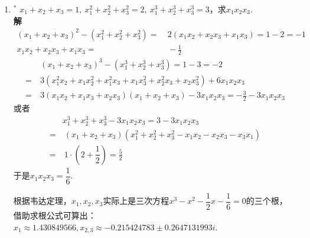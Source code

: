 \begin{enumerate}[label={【\textbf{例\thechapter.\arabic*}】},
 leftmargin=\inteval{\myenumleftmargin}pt,
 itemsep=\inteval{\myenumitempsep}pt,
 itemindent=\inteval{\myenumitemindent}pt]
\item $ ^* $ $ x_1+x_2+x_3=1,\ x_1^2+x_2^2+x_3^2=2,\ 
x_1^3+x_2^3+x_3^3=3 $，求$ x_1x_2x_3 $. \\
\textbf{解}\ 
\begin{align*}
    (x_1+x_2+x_3)^2-(x_1^2+x_2^2+x_3^2)=&\ 2(x_1x_2+x_2x_3+x_1x_3)=1-2=-1\\
    x_1x_2+x_2x_3+x_1x_3=&\ -\frac{1}{2} 
\end{align*}
\begin{align*}
     &\ (x_1+x_2+x_3)^3-(x_1^3+x_2^3+x_3^3)=1-3=-2 \\
    =&\ 3(x_1^2x_2+x_1x_2^2+x_1^2x_3+x_1x_3^2+x_2^2x_3+x_2x_3^2)+6x_1x_2x_3\\
    =&\ 3(x_1x_2+x_1x_3+x_2x_3)(x_1+x_2+x_3)-3x_1x_2x_3
    =-\frac{3}{2}-3x_1x_2x_3
\end{align*}
或者
\begin{align*}
    & x_1^3+x_2^3+x_3^3-3x_1x_2x_3=3-3x_1x_2x_3  \\
    =&\  (x_1+x_2+x_3)(x_1^2+x_2^2+x_3^2-x_1x_2-x_2x_3-x_3x_1)\\
    =&\  1\cdot\left(2+\dfrac{1}{2}\right)=\frac{5}{2}
\end{align*}
于是$ x_1x_2x_3=\dfrac{1}{6} $. 

根据韦达定理，$ x_1,x_2,x_3 $实际上是三次方程$ x^3-x^2-\dfrac{1}{2}x-
\dfrac{1}{6}=0 $的三个根，
借助求根公式可算出：$ x_1 \approx 1.430849566,x_{2,3}\approx -0.215424783 
\pm 0.2647131993 i $. 

\end{enumerate}

